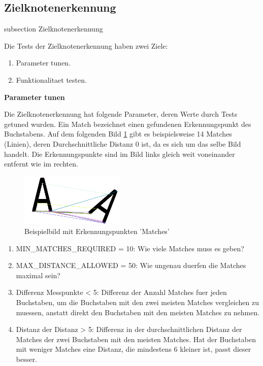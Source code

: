 



\subsection*{Zielknotenerkennung}\label{target-node-unittests}
    {subsection}
    {Zielknotenerkennung}

Die Tests der Zielknotenerkennung haben zwei Ziele:

\begin{enumerate}
    \item Parameter tunen.
    \item Funktionalitaet testen.
\end{enumerate}

\textbf{Parameter tunen}

Die Zielknotenerkennung hat folgende Parameter, deren Werte durch Tests getuned wurden. Ein Match bezeichnet einen gefundenen Erkennungspunkt des Buchstabens. Auf dem folgenden Bild \ref{img:orb-example} gibt es beispielsweise 14 Matches (Linien), deren Durchschnittliche Distanz 0 ist, da es sich um das selbe Bild handelt. Die Erkennungspunkte sind im Bild links gleich weit voneinander entfernt wie im rechten.

\begin{figure}[H]
\centering
\includegraphics[width=5cm]{assets/IT/testing/target_node/orb-a.png}
\caption{Beispielbild mit Erkennungspunkten 'Matches'}
\label{img:orb-example}
\end{figure}

\begin{enumerate}
    \item MIN\_MATCHES\_REQUIRED = 10: Wie viele Matches muss es geben?
    \item MAX\_DISTANCE\_ALLOWED = 50: Wie ungenau duerfen die Matches maximal sein?
    \item Differenz Messpunkte < 5: Differenz der Anzahl Matches fuer jeden Buchstaben, um die Buchstaben mit den zwei meisten Matches vergleichen zu muessen, anstatt direkt den Buchstaben mit den meisten Matches zu nehmen.
    \item Distanz der Distanz > 5: Differenz in der durchschnittlichen Distanz der Matches der zwei Buchstaben mit den meisten Matches. Hat der Buchstaben mit weniger Matches eine Distanz, die mindestens 6 kleiner ist, passt dieser besser.
\end{enumerate}

